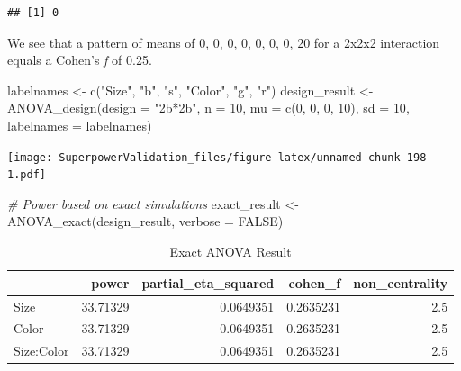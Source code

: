 \documentclass[
]{book}
\newenvironment{Shaded}{\begin{snugshade}}{\end{snugshade}}
\newcommand{\AttributeTok}[1]{\textcolor[rgb]{0.77,0.63,0.00}{#1}}
\newcommand{\CommentTok}[1]{\textcolor[rgb]{0.56,0.35,0.01}{\textit{#1}}}
\newcommand{\ConstantTok}[1]{\textcolor[rgb]{0.00,0.00,0.00}{#1}}
\newcommand{\DecValTok}[1]{\textcolor[rgb]{0.00,0.00,0.81}{#1}}
\newcommand{\FunctionTok}[1]{\textcolor[rgb]{0.00,0.00,0.00}{#1}}
\newcommand{\NormalTok}[1]{#1}
\newcommand{\OtherTok}[1]{\textcolor[rgb]{0.56,0.35,0.01}{#1}}
\newcommand{\SpecialCharTok}[1]{\textcolor[rgb]{0.00,0.00,0.00}{#1}}
\newcommand{\StringTok}[1]{\textcolor[rgb]{0.31,0.60,0.02}{#1}}
\begin{document}
\begin{Shaded}
\end{Shaded}

\begin{verbatim}
## [1] 0
\end{verbatim}

We see that a pattern of means of 0, 0, 0, 0, 0, 0, 0, 20 for a 2x2x2 interaction equals a Cohen's \emph{f} of 0.25.

\begin{Shaded}
\begin{Highlighting}[]
\NormalTok{labelnames }\OtherTok{\textless{}{-}} \FunctionTok{c}\NormalTok{(}\StringTok{"Size"}\NormalTok{, }\StringTok{"b"}\NormalTok{, }\StringTok{"s"}\NormalTok{, }\StringTok{"Color"}\NormalTok{, }\StringTok{"g"}\NormalTok{, }\StringTok{"r"}\NormalTok{)}
\NormalTok{design\_result }\OtherTok{\textless{}{-}} \FunctionTok{ANOVA\_design}\NormalTok{(}\AttributeTok{design =} \StringTok{"2b*2b"}\NormalTok{, }
                              \AttributeTok{n =} \DecValTok{10}\NormalTok{, }
                              \AttributeTok{mu =} \FunctionTok{c}\NormalTok{(}\DecValTok{0}\NormalTok{, }\DecValTok{0}\NormalTok{, }\DecValTok{0}\NormalTok{, }\DecValTok{10}\NormalTok{), }
                              \AttributeTok{sd =} \DecValTok{10}\NormalTok{, }
                              \AttributeTok{labelnames =}\NormalTok{ labelnames) }
\end{Highlighting}
\end{Shaded}

\texttt{[image: SuperpowerValidation\_files/figure-latex/unnamed-chunk-198-1.pdf]}

\begin{Shaded}
\begin{Highlighting}[]
\CommentTok{\# Power based on exact simulations}
\NormalTok{exact\_result }\OtherTok{\textless{}{-}} \FunctionTok{ANOVA\_exact}\NormalTok{(design\_result,}
                            \AttributeTok{verbose =} \ConstantTok{FALSE}\NormalTok{)}
\end{Highlighting}
\end{Shaded}

\begin{table}[!h]

\caption{\label{tab:unnamed-chunk-199}Exact ANOVA Result}
\centering
\begin{tabular}[t]{l|r|r|r|r}
\hline
  & power & partial\_eta\_squared & cohen\_f & non\_centrality\\
\hline
Size & 33.71329 & 0.0649351 & 0.2635231 & 2.5\\
\hline
Color & 33.71329 & 0.0649351 & 0.2635231 & 2.5\\
\hline
Size:Color & 33.71329 & 0.0649351 & 0.2635231 & 2.5\\
\hline
\end{tabular}
\end{table}
\end{document}
